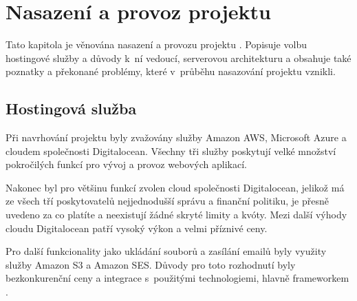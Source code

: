 \section{Nasazení a provoz projektu}
\label{sec:deployment-running}

Tato kapitola je věnována nasazení a provozu projektu \bso{}. Popisuje volbu hostingové služby a důvody k~ní vedoucí, serverovou architekturu a obsahuje také poznatky a překonané problémy, které v~průběhu nasazování projektu vznikli.

\subsection{Hostingová služba}
\label{sub:hosting}

Při navrhování projektu \bso{} byly zvažovány služby Amazon AWS\cite{amazon-aws}, Microsoft Azure\cite{ms-azure} a cloudem společnosti Digitalocean\cite{digitalocean}. Všechny tři služby poskytují velké množství pokročilých funkcí pro vývoj a provoz webových aplikací. 

Nakonec byl pro většinu funkcí zvolen cloud společnosti Digitalocean, jelikož má ze všech tří poskytovatelů nejjednodušší správu a finanční politiku, je přesně uvedeno za co platíte a neexistují žádné skryté limity a kvóty. Mezi další výhody cloudu Digitalocean patří vysoký výkon a velmi příznivé ceny.\cite{digitalocean-advantages}

Pro další funkcionality jako ukládání souborů a zasílání emailů byly využity služby Amazon S3\cite{amazon-s3} a Amazon SES\cite{amazon-ses}. Důvody pro toto rozhodnutí byly bezkonkurenční ceny a integrace s~použitými technologiemi, hlavně \gls{framework}em .


